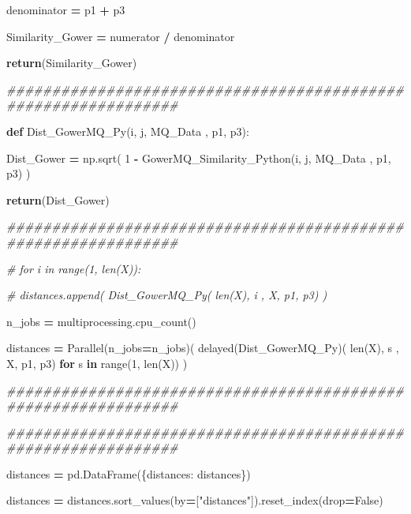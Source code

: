 \documentclass[
  11pt,
  a4paper,
]{article}
\newenvironment{Shaded}{\begin{snugshade}}{\end{snugshade}}
\newcommand{\BuiltInTok}[1]{#1}
\newcommand{\CommentTok}[1]{\textcolor[rgb]{0.56,0.35,0.01}{\textit{#1}}}
\newcommand{\ControlFlowTok}[1]{\textcolor[rgb]{0.13,0.29,0.53}{\textbf{#1}}}
\newcommand{\DecValTok}[1]{\textcolor[rgb]{0.00,0.00,0.81}{#1}}
\newcommand{\KeywordTok}[1]{\textcolor[rgb]{0.13,0.29,0.53}{\textbf{#1}}}
\newcommand{\NormalTok}[1]{#1}
\newcommand{\OperatorTok}[1]{\textcolor[rgb]{0.81,0.36,0.00}{\textbf{#1}}}
\newcommand{\StringTok}[1]{\textcolor[rgb]{0.31,0.60,0.02}{#1}}
\newcommand{\VariableTok}[1]{\textcolor[rgb]{0.00,0.00,0.00}{#1}}
\begin{document}
\begin{Shaded}
\begin{Highlighting}[]
\NormalTok{            denominator }\OperatorTok{=}\NormalTok{ p1 }\OperatorTok{+}\NormalTok{ p3}

\NormalTok{            Similarity\_Gower }\OperatorTok{=}\NormalTok{ numerator }\OperatorTok{/}\NormalTok{ denominator  }

            \ControlFlowTok{return}\NormalTok{(Similarity\_Gower)}



\CommentTok{\#\#\#\#\#\#\#\#\#\#\#\#\#\#\#\#\#\#\#\#\#\#\#\#\#\#\#\#\#\#\#\#\#\#\#\#\#\#\#\#\#\#\#\#\#\#\#\#\#\#\#\#\#\#\#\#\#\#\#\#\#\#\#}

        \KeywordTok{def}\NormalTok{ Dist\_GowerMQ\_Py(i, j, MQ\_Data ,  p1, p3):}

\NormalTok{                Dist\_Gower }\OperatorTok{=}\NormalTok{ np.sqrt( }\DecValTok{1} \OperatorTok{{-}}\NormalTok{ GowerMQ\_Similarity\_Python(i, j, MQ\_Data , p1, p3) )}

                \ControlFlowTok{return}\NormalTok{(Dist\_Gower)}


\CommentTok{\#\#\#\#\#\#\#\#\#\#\#\#\#\#\#\#\#\#\#\#\#\#\#\#\#\#\#\#\#\#\#\#\#\#\#\#\#\#\#\#\#\#\#\#\#\#\#\#\#\#\#\#\#\#\#\#\#\#\#\#\#\#\#}

        \CommentTok{\# for i in range(1, len(X)):}

        \CommentTok{\# distances.append( Dist\_GowerMQ\_Py( len(X), i , X, p1, p3) )}

\NormalTok{        n\_jobs  }\OperatorTok{=}\NormalTok{ multiprocessing.cpu\_count()}

\NormalTok{        distances }\OperatorTok{=}\NormalTok{ Parallel(n\_jobs}\OperatorTok{=}\NormalTok{n\_jobs)( delayed(Dist\_GowerMQ\_Py)( }\BuiltInTok{len}\NormalTok{(X), s , X, p1, p3) }\ControlFlowTok{for}\NormalTok{ s }\KeywordTok{in} \BuiltInTok{range}\NormalTok{(}\DecValTok{1}\NormalTok{, }\BuiltInTok{len}\NormalTok{(X)) )}

\CommentTok{\#\#\#\#\#\#\#\#\#\#\#\#\#\#\#\#\#\#\#\#\#\#\#\#\#\#\#\#\#\#\#\#\#\#\#\#\#\#\#\#\#\#\#\#\#\#\#\#\#\#\#\#\#\#\#\#\#\#\#\#\#\#\#}

\CommentTok{\#\#\#\#\#\#\#\#\#\#\#\#\#\#\#\#\#\#\#\#\#\#\#\#\#\#\#\#\#\#\#\#\#\#\#\#\#\#\#\#\#\#\#\#\#\#\#\#\#\#\#\#\#\#\#\#\#\#\#\#\#\#\#}

\NormalTok{    distances }\OperatorTok{=}\NormalTok{ pd.DataFrame(\{}\StringTok{\textquotesingle{}distances\textquotesingle{}}\NormalTok{: distances\})}

\NormalTok{    distances }\OperatorTok{=}\NormalTok{ distances.sort\_values(by}\OperatorTok{=}\NormalTok{[}\StringTok{"distances"}\NormalTok{]).reset\_index(drop}\OperatorTok{=}\VariableTok{False}\NormalTok{)}
        

\end{Highlighting}
\end{Shaded}
\end{document}

